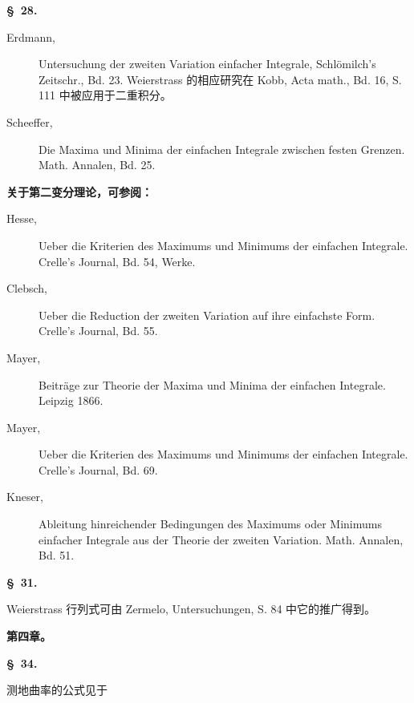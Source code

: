 \documentclass[11pt,a4paper,leqno]{article}
\begin{document}
\begin{center}{\bfseries \S~28.}\end{center}

\begin{description}
\item[Erdmann,] Untersuchung der zweiten Variation einfacher Integrale,
Schlömilch's Zeitschr., Bd. 23. Weierstrass 的相应研究在 Kobb, Acta math.,
Bd. 16, S. 111 中被应用于二重积分。

\item[Scheeffer,] Die Maxima und Minima der einfachen Integrale zwischen festen
Grenzen. Math. Annalen, Bd. 25.
\end{description}

\begin{center}{\bfseries 关于第二变分理论，可参阅：}\end{center}

\begin{description}
\item[Hesse,] Ueber die Kriterien des Maximums und Minimums der einfachen
Integrale. Crelle's Journal, Bd. 54, Werke.

\item[Clebsch,] Ueber die Reduction der zweiten Variation auf ihre einfachste
Form. Crelle's Journal, Bd. 55.

\item[Mayer,] Beiträge zur Theorie der Maxima und Minima der einfachen
Integrale. Leipzig 1866.

\item[Mayer,] Ueber die Kriterien des Maximums und Minimums der einfachen
Integrale. Crelle's Journal, Bd. 69.

\item[Kneser,] Ableitung hinreichender Bedingungen des Maximums oder Minimums
einfacher Integrale aus der Theorie der zweiten Variation. Math. Annalen,
Bd. 51.
\end{description}

\begin{center}{\bfseries \S~31.}\end{center}

\noindent Weierstrass 行列式可由 Zermelo, Untersuchungen, S. 84 中它的推广得到。

\begin{center}
{\large\bfseries 第四章。}

{\bfseries \S~34.}
\end{center}

\noindent 测地曲率的公式见于
\end{document}
